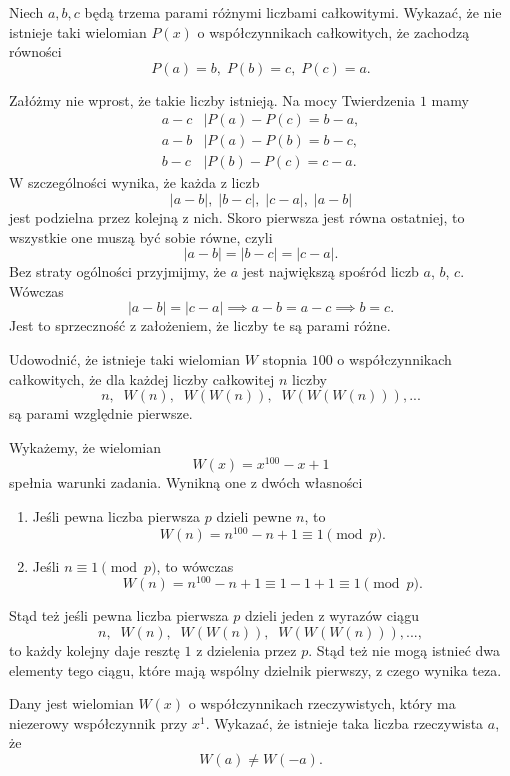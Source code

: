 \newpage
{}

\begin{problem}{1}
	Niech $a,b,c$ będą trzema parami różnymi liczbami całkowitymi. Wykazać, że nie istnieje taki wielomian $P(x)$ o współczynnikach całkowitych, że zachodzą równości
    \[
        P(a) = b,\; P(b) = c,\; P(c) = a.
    \]
\end{problem}

\noindent
Załóżmy nie wprost, że takie liczby istnieją. 
Na mocy Twierdzenia $1$ mamy
\begin{align*}
	a - c &\big| P(a) - P(c) = b - a, \\ 
	a - b &\big| P(a) - P(b) = b - c, \\
	b - c &\big| P(b) - P(c) = c - a.
\end{align*}
W szczególności wynika, że każda z liczb
\[
	|a - b|, \;|b - c|,\; |c - a|,\; |a - b|
\]
jest podzielna przez kolejną z nich. Skoro pierwsza jest równa ostatniej, to wszystkie one muszą być sobie równe, czyli
\[
	|a - b| = |b - c| = |c - a|.
\]
Bez straty ogólności przyjmijmy, że $a$ jest największą spośród liczb $a$, $b$, $c$. Wówczas
\[
	|a - b| = |c - a| \implies a - b = a - c \implies b = c.
\]
Jest to sprzeczność z założeniem, że liczby te są parami różne.

\begin{problem}{2}
	Udowodnić, że istnieje taki wielomian $W$ stopnia $100$ o współczynnikach całkowitych, że dla każdej liczby całkowitej $n$ liczby
	\[
		n,\;\; W(n),\;\; W(W(n)),\;\; W(W(W(n))), ...
	\]
	są parami względnie pierwsze.
\end{problem}

\noindent
Wykażemy, że wielomian
\[
	W(x) = x^{100} - x + 1
\]
spełnia warunki zadania. Wynikną one z dwóch własności
\begin{enumerate}
	\item Jeśli pewna liczba pierwsza $p$ dzieli pewne $n$, to
	\[
		W(n) = n^{100} - n + 1 \equiv 1 \pmod{p}.
	\]
	\item Jeśli $n \equiv 1 \pmod{p}$, to wówczas
	\[
		W(n) = n^{100} - n + 1 \equiv 1 - 1 + 1 \equiv 1 \pmod{p}.
	\]
\end{enumerate}
Stąd też jeśli pewna liczba pierwsza $p$ dzieli jeden z wyrazów ciągu
\[
	n,\;\; W(n),\;\; W(W(n)),\;\; W(W(W(n))), ...,
\]
to każdy kolejny daje resztę $1$ z dzielenia przez $p$. Stąd też nie mogą istnieć dwa elementy tego ciągu, które mają wspólny dzielnik pierwszy, z czego wynika teza.

\begin{problem}{3}
	Dany jest wielomian $W(x)$ o współczynnikach rzeczywistych, który ma niezerowy współczynnik przy $x^1$. Wykazać, że istnieje taka liczba rzeczywista $a$, że
	\[
		W(a) \neq W(-a).
	\]
\end{problem}

